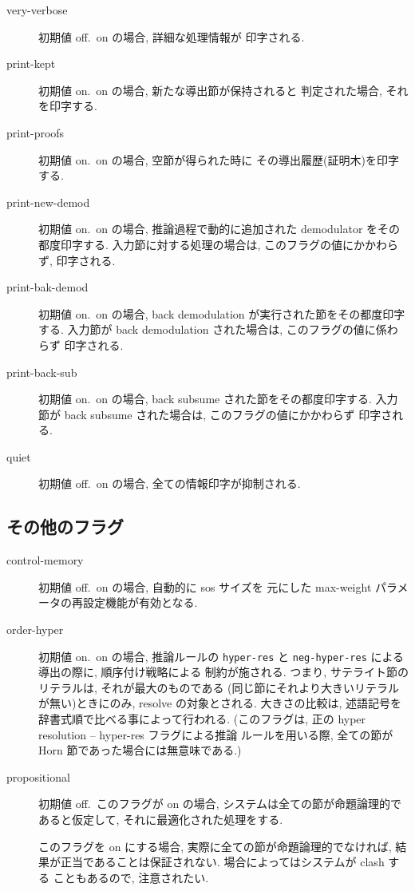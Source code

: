 \begin{description}
\item[very-verbose] 初期値 off.\ on の場合, 詳細な処理情報が
  印字される. 
\item[print-kept] 初期値 on.\ on の場合, 新たな導出節が保持されると
  判定された場合, それを印字する.

\item[print-proofs] 初期値 on.\ on の場合, 空節が得られた時に
  その導出履歴(証明木)を印字する. 

\item[print-new-demod] 初期値 on.\ on の場合, 
  推論過程で動的に追加された demodulator をその都度印字する.
  入力節に対する処理の場合は, このフラグの値にかかわらず,
  印字される.

\item[print-bak-demod] 初期値 on.\ on の場合,
  back demodulation が実行された節をその都度印字する.
  入力節が back demodulation された場合は, このフラグの値に係わらず
  印字される.

\item[print-back-sub] 初期値 on.\ on の場合,
  back subsume された節をその都度印字する.
  入力節が back subsume された場合は, このフラグの値にかかわらず
  印字される.

\item[quiet] 初期値 off.\ on の場合, 全ての情報印字が抑制される.

\end{description}

\subsection{その他のフラグ}
\label{sec:misc-flags}

\begin{description}
\item[control-memory] 初期値 off.\ on の場合, 自動的に sos サイズを
  元にした max-weight パラメータの再設定機能が有効となる.

\item[order-hyper] 初期値 on.\ on の場合, 推論ルールの \texttt{hyper-res}
  と \texttt{neg-hyper-res} による導出の際に, 順序付け戦略による
  制約が施される. つまり, サテライト節のリテラルは, それが最大のものである
  (同じ節にそれより大きいリテラルが無い)ときにのみ, resolve の対象とされる.
  大きさの比較は, 述語記号を辞書式順で比べる事によって行われる.
  (このフラグは, 正の hyper resolution -- hyper-res フラグによる推論
  ルールを用いる際, 全ての節が Horn 節であった場合には無意味である.)

\item[propositional] 初期値 off.\ このフラグが on の場合,
  システムは全ての節が命題論理的であると仮定して, それに最適化された処理をする.

  このフラグを on にする場合, 実際に全ての節が命題論理的でなければ,
  結果が正当であることは保証されない. 場合によってはシステムが clash する
  こともあるので, 注意されたい.

\end{description}

